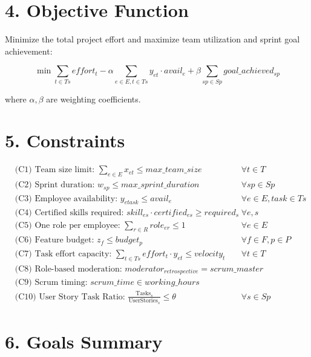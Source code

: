 \documentclass{article}
\begin{document}
\section*{4. Objective Function}
Minimize the total project effort and maximize team utilization and sprint goal achievement:

\[
\min \sum_{t \in Ts} effort_t - \alpha \sum_{e \in E, t \in Ts} y_{et} \cdot avail_e + \beta \sum_{sp \in Sp} goal\_achieved_{sp}
\]

where $\alpha, \beta$ are weighting coefficients.

\section*{5. Constraints}

\begin{align}
&\text{(C1) Team size limit: } \sum_{e \in E} x_{et} \leq max\_team\_size & \forall t \in T \\
&\text{(C2) Sprint duration: } w_{sp} \leq max\_sprint\_duration & \forall sp \in Sp \\
&\text{(C3) Employee availability: } y_{etask} \leq avail_e & \forall e \in E, task \in Ts \\
&\text{(C4) Certified skills required: } skill_{es} \cdot certified_{es} \geq required_s & \forall e,s \\
&\text{(C5) One role per employee: } \sum_{r \in R} role_{er} \leq 1 & \forall e \in E \\
&\text{(C6) Feature budget: } z_{f} \leq budget_p & \forall f \in F, p \in P \\
&\text{(C7) Task effort capacity: } \sum_{t \in Ts} effort_t \cdot y_{et} \leq velocity_t & \forall t \in T \\
&\text{(C8) Role-based moderation: } moderator_{retrospective} = scrum\_master & \\
&\text{(C9) Scrum timing: } scrum\_time \in working\_hours & \\
&\text{(C10) User Story Task Ratio: } \frac{\text{Tasks}_s}{\text{UserStories}_s} \leq \theta & \forall s \in Sp
\end{align}

\section*{6. Goals Summary}
\end{document}
